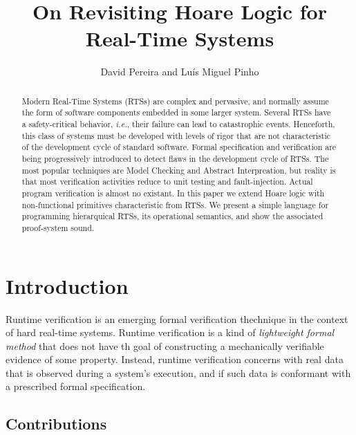 \documentclass[]{llncs}
\begin{document}
\title{On Revisiting Hoare Logic for Real-Time Systems}

\author{David Pereira and Luís Miguel Pinho}

\maketitle

\begin{abstract}
  Modern Real-Time Systems (RTSs) are complex and pervasive, and
  normally assume the form of software components embedded in some
  larger system. Several RTSs have a safety-critical behavior, {\sl
    i.e.}, their failure can lead to catastrophic events. Henceforth,
  this class of systems must be developed with levels of rigor that
  are not characteristic of the development cycle of standard
  software. Formal specification and verification are being
  progressively introduced to detect flaws in the development cycle of
  RTSs. The most popular techniques are Model Checking and Abstract
  Interpreation, but reality is that most verification activities
  reduce to unit testing and fault-injection. Actual program
  verification is almost no existant. In this paper we extend Hoare
  logic with non-functional primitives characteristic from RTSs. We
  present a simple language for programming hierarquical RTSs, its
  operational semantics, and show the associated proof-system sound.
\end{abstract}


\section{Introduction}

Runtime verification is an emerging formal verification thechnique in the context of hard real-time systems. Runtime verification is a kind of {\em lightweight formal method} that does not have th goal of constructing a mechanically verifiable evidence of some property. Instead, runtime verification concerns with real data that is observed during a system's execution, and if such data is conformant with a prescribed formal specification.



\subsection{Contributions}
\end{document}

